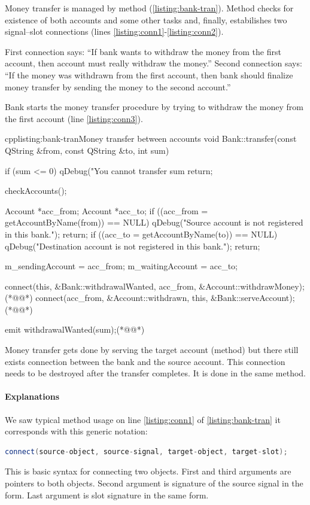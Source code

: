 Money transfer is managed by method (\autoref{listing:bank-tran}). Method checks for existence of both accounts and some other tasks and, finally, estabilishes two signal--slot connections (lines \ref{listing:conn1}-\ref{listing:conn2}).

First connection says: \enquote{If bank wants to withdraw the money from the first account, then account must really withdraw the money.} Second connection says: \enquote{If the money was withdrawn from the first account, then bank should finalize money transfer by sending the money to the second account.}

Bank starts the money transfer procedure by trying to withdraw the money from the first account (line \ref{listing:conn3}).

\begin{fdoccode}{cpp}{listing:bank-tran}{Money transfer between accounts}
void Bank::transfer(const QString &from, const QString &to, int sum) {
    if (sum <= 0) {
		qDebug("You cannot transfer sum %
		return;
    }

    checkAccounts();

    Account *acc_from;
    Account *acc_to;
    if ((acc_from = getAccountByName(from)) == NULL) {
		qDebug("Source account is not registered in this bank.");
		return;
    }
    if ((acc_to = getAccountByName(to)) == NULL) {
		qDebug("Destination account is not registered in this bank.");
		return;
    }

    m_sendingAccount = acc_from;
    m_waitingAccount = acc_to;

    connect(this, &Bank::withdrawalWanted, acc_from, &Account::withdrawMoney);(*@\label{listing:conn1}@*)
    connect(acc_from, &Account::withdrawn, this, &Bank::serveAccount);(*@\label{listing:conn2}@*)

    emit withdrawalWanted(sum);(*@\label{listing:conn3}@*)
}
\end{fdoccode}

Money transfer gets done by serving the target account (method) but there still exists connection between the bank and the source account. This connection needs to be destroyed after the transfer completes. It is done in the same method.

\paragraph{Explanations}
We saw typical method usage on line \ref{listing:conn1} of \autoref{listing:bank-tran} it corresponds with this generic notation:
\begin{lstlisting}[firstnumber=1,language=cpp]
connect(source-object, source-signal, target-object, target-slot);
\end{lstlisting}
This is basic syntax for connecting two objects. First and third arguments are pointers to both objects. Second argument is signature of the source signal in the form. Last argument is slot signature in the same form.

